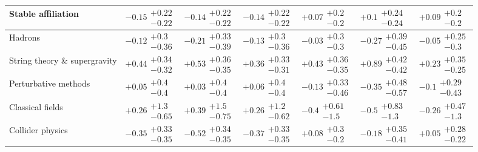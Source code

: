 \begin{table}[H]
\begin{tabular}{lllllll}
\textbf{Stable affiliation} & $-0.15\substack{+0.22 \\ -0.22}$ & $-0.14\substack{+0.22 \\ -0.22}$ & $-0.14\substack{+0.22 \\ -0.22}$ & $+0.07\substack{+0.2 \\ -0.2}$ & $+0.1\substack{+0.24 \\ -0.24}$ & $+0.09\substack{+0.2 \\ -0.2}$ \\
\hline Hadrons & $-0.12\substack{+0.3 \\ -0.36}$ & $-0.21\substack{+0.33 \\ -0.39}$ & $-0.13\substack{+0.3 \\ -0.36}$ & $-0.03\substack{+0.3 \\ -0.3}$ & $-0.27\substack{+0.39 \\ -0.45}$ & $-0.05\substack{+0.25 \\ -0.3}$ \\
String theory \& supergravity & $\bm{+0.44}\substack{+0.34 \\ -0.32}$ & $\bm{+0.53}\substack{+0.36 \\ -0.35}$ & $\bm{+0.36}\substack{+0.33 \\ -0.31}$ & $\bm{+0.43}\substack{+0.36 \\ -0.35}$ & $\bm{+0.89}\substack{+0.42 \\ -0.42}$ & $+0.23\substack{+0.35 \\ -0.25}$ \\
Perturbative methods & $+0.05\substack{+0.4 \\ -0.4}$ & $+0.03\substack{+0.4 \\ -0.4}$ & $+0.06\substack{+0.4 \\ -0.4}$ & $-0.13\substack{+0.33 \\ -0.46}$ & $-0.35\substack{+0.48 \\ -0.57}$ & $-0.1\substack{+0.29 \\ -0.43}$ \\
Classical fields & $+0.26\substack{+1.3 \\ -0.65}$ & $+0.39\substack{+1.5 \\ -0.75}$ & $+0.26\substack{+1.2 \\ -0.62}$ & $-0.4\substack{+0.61 \\ -1.5}$ & $-0.5\substack{+0.83 \\ -1.3}$ & $-0.26\substack{+0.47 \\ -1.3}$ \\
Collider physics & $\bm{-0.35}\substack{+0.33 \\ -0.35}$ & $\bm{-0.52}\substack{+0.34 \\ -0.35}$ & $\bm{-0.37}\substack{+0.33 \\ -0.35}$ & $+0.08\substack{+0.3 \\ -0.2}$ & $-0.18\substack{+0.35 \\ -0.41}$ & $+0.05\substack{+0.28 \\ -0.22}$ \\

\end{tabular}
\end{table}

